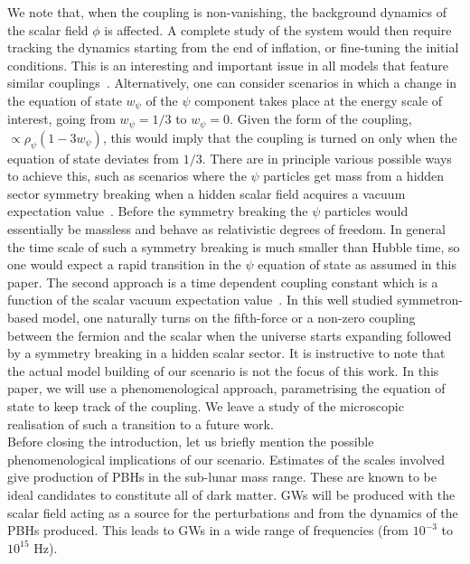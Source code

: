 \documentclass[a4paper, amsfonts, amssymb, amsmath, reprint, showkeys, nofootinbib, twoside, superscriptaddress]{revtex4-1}
\begin{document}
We note that, when the coupling is non-vanishing, the background dynamics of the scalar field $\phi$ is affected. A complete study of the system would then require tracking the dynamics starting from the end of inflation, or fine-tuning the initial conditions. This is an interesting and important issue in all models that feature similar couplings~\cite{Das:2005yj, Amendola:1999er, Vagnozzi:2021quy, Tsai:2021irw, Savastano:2019zpr,  Amendola:2017xhl, Damour:1990tw, hep-th/9408025, Amendola:1999er, gr-qc/0108016, astro-ph/0303145,
astro-ph/0208032, astro-ph/0306343, astro-ph/0212518, astro-ph/0307350, Amendola:2003wa, Domenech:2021uyx}. Alternatively, one can consider scenarios in which a change in the equation of state $w_\psi$ of the $\psi$ component takes place at the energy scale of interest, going from $w_\psi = 1/3$ to $w_\psi = 0$. Given the form of the coupling, $\propto \rho_\psi (1 - 3 w_\psi)$, this would imply that the coupling is turned on only when the equation of state deviates from $1/3$. There are in principle various possible ways to achieve this, such as scenarios where the $\psi$ particles get mass from a hidden sector symmetry breaking when a hidden scalar field acquires a vacuum expectation value~\cite{Gehrlein:2019iwl, Shelton:2010ta}. Before the symmetry breaking the $\psi$ particles would essentially be massless and behave as relativistic degrees of freedom. In general the time scale of such a symmetry breaking is much smaller than Hubble time, so one would expect a rapid transition in the $\psi$ equation of state as assumed in this paper. The second approach is a time dependent coupling constant which  is a function of the scalar vacuum expectation value~\cite{Hinterbichler:2010es}. In this well studied symmetron-based model, one naturally turns on the fifth-force or a non-zero coupling between the fermion and the scalar  when the universe starts expanding followed by a symmetry breaking in a hidden scalar sector. It is instructive to note that the actual model building of our scenario is not the focus of this work. In this paper, we will use a phenomenological approach, parametrising the equation of state to keep track of the coupling. We leave a study of the microscopic realisation of such a transition to a future work.\\

Before closing the introduction, let us briefly mention the possible phenomenological implications of our scenario. Estimates of the scales involved give production of PBHs
in the sub-lunar mass range. These are known to be ideal candidates to constitute all of dark matter. GWs will be produced with the scalar field acting as a source for the perturbations and from the dynamics of the PBHs produced. This leads to GWs in a wide range of frequencies (from $10^{-3}$ to $10^{15}$ Hz).\\
 
\end{document}
